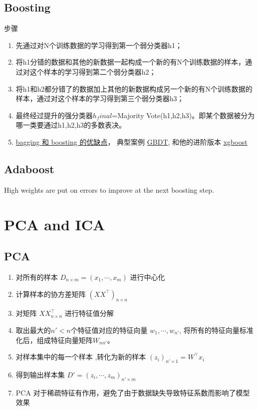 \documentclass[12pt]{article}
\numberwithin{theorem}{section} %
\numberwithin{definition}{section} %
\numberwithin{assumption}{section} %
\numberwithin{lemma}{section} %
\numberwithin{remark}{section} %
\numberwithin{prop}{section} %
\numberwithin{corollary}{section} %
\numberwithin{example}{section} %
\numberwithin{question}{section} %
\numberwithin{problem}{section} %
\numberwithin{conjecture}{section} %
\numberwithin{append}{section} %
\numberwithin{property}{section} %
\begin{document}
\begin{CJK}{UTF8}{gbsn}
\subsection{Boosting}
步骤
\begin{enumerate}
	\item 先通过对N个训练数据的学习得到第一个弱分类器h1；
	\item 将h1分错的数据和其他的新数据一起构成一个新的有N个训练数据的样本，通过对这个样本的学习得到第二个弱分类器h2；
	\item 将h1和h2都分错了的数据加上其他的新数据构成另一个新的有N个训练数据的样本，通过对这个样本的学习得到第三个弱分类器h3；
	\item 最终经过提升的强分类器$h_final$=Majority Vote(h1,h2,h3)。即某个数据被分为哪一类要通过h1,h2,h3的多数表决。
	\item \href{https://blog.csdn.net/brucewong0516/article/details/78656299}{bagging 和 boosting 的优缺点}， 典型案例 \href{https://zhuanlan.zhihu.com/p/130461268}{GBDT}, 和他的进阶版本 \href{https://www.zhihu.com/question/41354392}{xgboost}
\end{enumerate}



\subsection{Adaboost}
High weights are put on errors to improve at the next boosting step.

\section{PCA and ICA}
\subsection{PCA}
\begin{enumerate}
	\item 对所有的样本 $D_{n\times m} = (x_1,\cdots,x_m) $ 进行中心化
	\item 计算样本的协方差矩阵 $(XX^\intercal)_{n\times n}$
	\item 对矩阵  $XX^\intercal_{n\times n}$ 进行特征值分解
	\item 取出最大的$n' < n$个特征值对应的特征向量 $w_1,\cdots,w_{n'}$, 将所有的特征向量标准化后，组成特征向量矩阵$W_{nn'}$。
	\item 对样本集中的每一个样本 ,转化为新的样本 $(z_i)_{n'\times 1} = W^\intercal x_i$
	\item 得到输出样本集 $D' = (z_i,\cdots,z_m)_{n'\times m}$
	\item PCA 对于稀疏特征有作用，避免了由于数据缺失导致特征系数而影响了模型效果
\end{enumerate}


\end{CJK}
\end{document}
